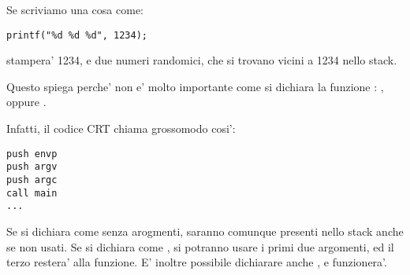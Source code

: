 Se scriviamo una cosa come:

\begin{lstlisting}
printf("%d %d %d", 1234);
\end{lstlisting}

\printf stampera' 1234, e due numeri randomici, che si trovano vicini a 1234 nello stack.

\par
Questo spiega perche' non e' molto importante come si dichiara la funzione \main : \main,  oppure .

Infatti, il codice \ac{CRT} chiama \main grossomodo cosi':

\begin{lstlisting}[style=customasmx86]
push envp
push argv
push argc
call main
...
\end{lstlisting}

Se si dichiara \main come \main senza arogmenti, saranno comunque presenti nello stack anche se non usati.
Se si dichiara \main come ,
si potranno usare i primi due argomenti, ed il terzo restera'  alla funzione.
E' inoltre possibile dichiarare anche , e funzionera'.
